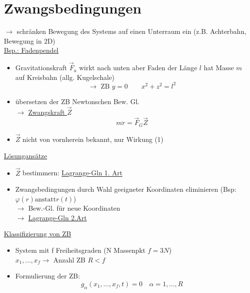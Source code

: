 \documentclass[titlepage,12pt,a4paper,ngerman]{report}
\newcommand{\tx}[1]{\textrm{#1}}
\begin{document}
{\section{Zwangsbedingungen}
$ \rightarrow $ schränken Bewegung des Systems auf einen Unterraum ein (z.B. Achterbahn, Bewegung in 2D)\\
\underline{Bsp.: Fadenpendel}\\
\begin{itemize}
	\item Gravitationskraft $ \vec{F}_a $ wirkt nach unten aber Faden der Länge $ l $ hat Masse $ m $ auf Kreisbahn (allg. Kugelschale)\\
	\begin{equation*}
	\rightarrow \tx{ ZB }y = 0 \qquad x^2 +z^2 = l^2 \tag{1}
	\end{equation*}
	\item übersetzen der ZB Newtonschen Bew. Gl.\\
	$ \rightarrow $ \underline{Zwangskraft $ \vec{Z} $}\\
	\begin{equation*}
	m \ddot{r} = \vec{F}_G \vec{Z} \tag{2}
	\end{equation*}
	\item $ \vec{Z} $ nicht von vornherein bekannt, nur Wirkung (1)
\end{itemize}
\underline{Lösungansätze}\\
\begin{itemize}
	\item $ \vec{Z} $ bestimmern: \underline{Lagrange-Gln 1. Art}
	\item  Zwangsbedingungen durch Wahl geeigneter Koordinaten eliminieren (Bsp: $ \varphi(r) \tx{anstatt} r(t) $)\\
	$ \rightarrow $ Bew.-Gl. für neue Koordinaten\\
	$ \rightarrow $ \underline{Lagrange-Gln 2.Art}
\end{itemize}
\underline{Klassifizierung von ZB}\\
\begin{itemize}
	\item System mit f Freiheitsgraden (N Massenpkt $ f=3N $)\\
	$ x_1,\dots,x_f \rightarrow $ Anzahl ZB $ R < f $
	\item Formulierung der ZB:\\
	\begin{equation*}
	g_\alpha (x_1,\dots,x_f,t) = 0 \quad \alpha = 1, \dots ,R \tag{3}
	\end{equation*}

\end{itemize}}
\end{document}
